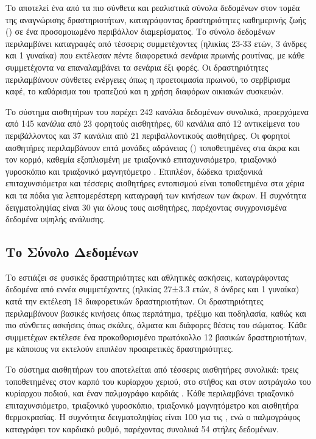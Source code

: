 Το  \cite{roggen2010,Chavarriaga2013} αποτελεί ένα από τα πιο σύνθετα και ρεαλιστικά σύνολα δεδομένων στον τομέα της αναγνώρισης δραστηριοτήτων, καταγράφοντας
δραστηριότητες καθημερινής ζωής () σε ένα προσομοιωμένο περιβάλλον διαμερίσματος.
Το σύνολο δεδομένων περιλαμβάνει καταγραφές από τέσσερις συμμετέχοντες (ηλικίας 23-33 ετών, 3 άνδρες και 1 γυναίκα) που εκτέλεσαν πέντε διαφορετικά σενάρια πρωινής ρουτίνας, με κάθε συμμετέχοντα
να επαναλαμβάνει τα σενάρια έξι φορές.
Οι δραστηριότητες περιλαμβάνουν σύνθετες ενέργειες όπως η προετοιμασία πρωινού, το σερβίρισμα καφέ, το καθάρισμα του τραπεζιού και η χρήση διαφόρων οικιακών συσκευών.

Το σύστημα αισθητήρων του  παρέχει 242 κανάλια δεδομένων συνολικά, προερχόμενα από 145 κανάλια από 23 φορητούς αισθητήρες, 60 κανάλια από 12 αντικείμενα του περιβάλλοντος και 37 κανάλια από 21 περιβαλλοντικούς αισθητήρες.
Οι φορητοί αισθητήρες περιλαμβάνουν επτά μονάδες αδράνειας () τοποθετημένες στα άκρα και τον κορμό, καθεμία εξοπλισμένη με τριαξονικό επιταχυνσιόμετρο, τριαξονικό γυροσκόπιο και τριαξονικό μαγνητόμετρο \cite{Chavarriaga2013}.
Επιπλέον, δώδεκα τριαξονικά επιταχυνσιόμετρα και τέσσερις αισθητήρες εντοπισμού  είναι τοποθετημένα στα χέρια και τα πόδια για λεπτομερέστερη καταγραφή των κινήσεων των άκρων.
Η συχνότητα δειγματοληψίας είναι 30  για όλους τους αισθητήρες, παρέχοντας συγχρονισμένα δεδομένα υψηλής ανάλυσης.

\subsection{Το Σύνολο Δεδομένων }
Το  \cite{Reiss2012,Reiss2012creating} εστιάζει σε φυσικές δραστηριότητες και αθλητικές ασκήσεις, καταγράφοντας δεδομένα από εννέα συμμετέχοντες (ηλικίας 27±3.3 ετών, 8 άνδρες
και 1 γυναίκα) κατά την εκτέλεση 18 διαφορετικών δραστηριοτήτων.
Οι δραστηριότητες περιλαμβάνουν βασικές κινήσεις όπως περπάτημα, τρέξιμο και ποδηλασία, καθώς και πιο σύνθετες ασκήσεις όπως σκάλες, άλματα και διάφορες θέσεις του σώματος.
Κάθε συμμετέχων εκτέλεσε ένα προκαθορισμένο πρωτόκολλο 12 βασικών δραστηριοτήτων, με κάποιους να εκτελούν επιπλέον προαιρετικές δραστηριότητες.

Το σύστημα αισθητήρων του  αποτελείται από τέσσερις αισθητήρες συνολικά: τρεις  τοποθετημένες στον καρπό του κυρίαρχου χεριού, στο στήθος και στον αστράγαλο του κυρίαρχου ποδιού, και έναν παλμογράφο καρδιάς \cite{Reiss2012,Reiss2012creating}.
Κάθε  περιλαμβάνει τριαξονικό επιταχυνσιόμετρο, τριαξονικό γυροσκόπιο, τριαξονικό μαγνητόμετρο και αισθητήρα θερμοκρασίας.
Η συχνότητα δειγματοληψίας είναι 100  για τις , ενώ ο παλμογράφος καταγράφει τον καρδιακό ρυθμό, παρέχοντας συνολικά 54 στήλες δεδομένων.

